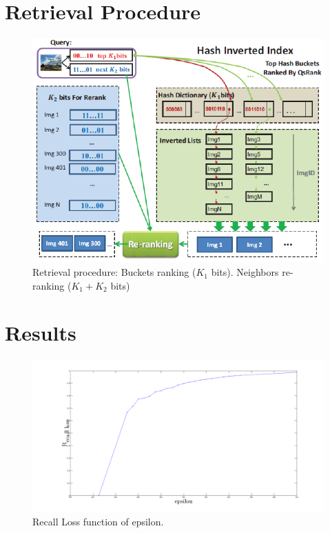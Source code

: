 \documentclass[english]{beamer}
\theoremstyle{plain}
\theoremstyle{remark}
\begin{document}
\section{Retrieval Procedure}

\begin{frame}
\begin{figure}[htbp]
	\begin{center}
	\includegraphics[width=.6\linewidth]{Images/algo.png}
	\caption{Retrieval procedure: Buckets ranking ($K_1$ bits). Neighbors re-ranking ($K_1+K_2$ bits)}
	\end{center}
	\label{fig:algo}
\end{figure}
\end{frame}

\section{Results}

\begin{frame}

\begin{figure}[htbp]
	\begin{center}
	\includegraphics[width=.8\linewidth]{Images/rloss.png}
	\end{center}
	\caption{Recall Loss function of epsilon.}
	\label{fig:rloss}
\end{figure}

\end{frame}

\end{document}
